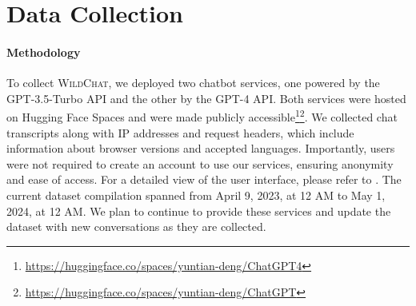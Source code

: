 \documentclass{article} %
\newcommand{\corpus}{\textsc{WildChat}\xspace}
\begin{document}
\section{Data Collection}
\paragraph{Methodology}
To collect \corpus, we deployed two chatbot services, one powered by the GPT-3.5-Turbo API and the other by the GPT-4 API. Both services were hosted on Hugging Face Spaces and were made publicly accessible\footnote{\url{https://huggingface.co/spaces/yuntian-deng/ChatGPT4}}\footnote{\url{https://huggingface.co/spaces/yuntian-deng/ChatGPT}}. We collected chat transcripts along with IP addresses and request headers, which include information about browser versions and accepted languages. Importantly, users were not required to create an account to use our services, ensuring anonymity and ease of access. For a detailed view of the user interface, please refer to . The current dataset compilation spanned from April 9, 2023, at 12 AM to May 1, 2024, at 12 AM. We plan to continue to provide these services and update the dataset with new conversations as they are collected.
\end{document}

